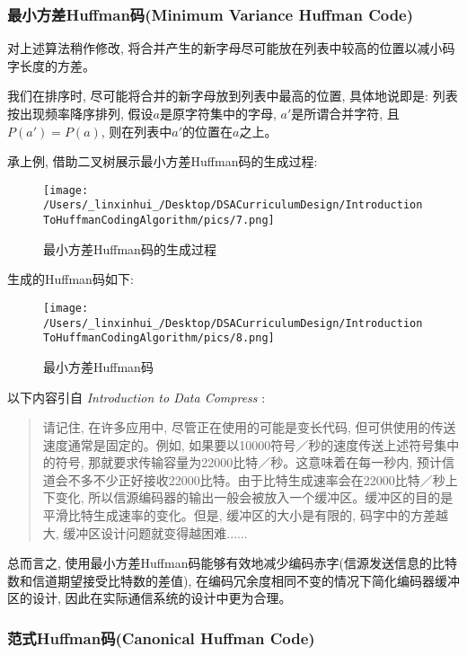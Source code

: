 \documentclass{article}
\begin{document}
\begin{CJK}{UTF8}{gbsn}
\subsubsection{最小方差Huffman码(Minimum Variance Huffman Code)}\label{header-n492}

对上述算法稍作修改, 将合并产生的新字母尽可能放在列表中较高的位置以减小码字长度的方差。

我们在排序时, 尽可能将合并的新字母放到列表中最高的位置, 具体地说即是: 列表按出现频率降序排列, 假设\(a\)是原字符集中的字母, \(a'\)是所谓合并字符, 且\(P(a') = P(a)\), 则在列表中\(a'\)的位置在\(a\)之上。

承上例, 借助二叉树展示最小方差Huffman码的生成过程:

\begin{figure}[H]
\centering
\texttt{[image: /Users/\_linxinhui\_/Desktop/DSACurriculumDesign/IntroductionToHuffmanCodingAlgorithm/pics/7.png]}
\caption{最小方差Huffman码的生成过程}
\end{figure}

生成的Huffman码如下:

\begin{figure}[H]
\centering
\texttt{[image: /Users/\_linxinhui\_/Desktop/DSACurriculumDesign/IntroductionToHuffmanCodingAlgorithm/pics/8.png]}
\caption{最小方差Huffman码}
\end{figure}

以下内容引自 \emph{Introduction to Data Compress} :

\begin{quote}
请记住, 在许多应用中, 尽管正在使用的可能是变长代码, 但可供使用的传送速度通常是固定的。例如, 如果要以10000符号／秒的速度传送上述符号集中的符号, 那就要求传输容量为22000比特／秒。这意味着在每一秒内, 预计信道会不多不少正好接收22000比特。由于比特生成速率会在22000比特／秒上下变化, 所以信源编码器的输出一般会被放入一个缓冲区。缓冲区的目的是平滑比特生成速率的变化。但是, 缓冲区的大小是有限的, 码字中的方差越大, 缓冲区设计问题就变得越困难......
\end{quote}

总而言之, 使用最小方差Huffman码能够有效地减少编码赤字(信源发送信息的比特数和信道期望接受比特数的差值), 在编码冗余度相同不变的情况下简化编码器缓冲区的设计, 因此在实际通信系统的设计中更为合理。

\subsubsection{范式Huffman码(Canonical Huffman Code)}\label{header-n503}


\end{CJK}
\end{document}
